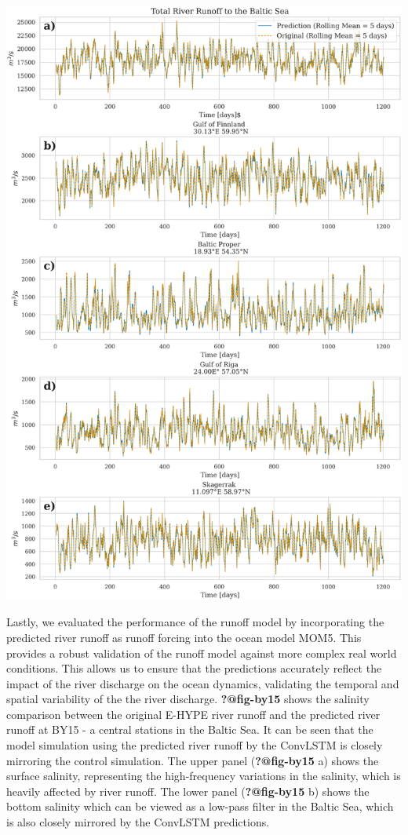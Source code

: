 \documentclass[
]{agujournal2019}
\begin{document}
\includegraphics{../src/figures/paper_total_river_runoff.png}

Lastly, we evaluated the performance of the runoff model by
incorporating the predicted river runoff as runoff forcing into the
ocean model MOM5. This provides a robust validation of the runoff model
against more complex real world conditions. This allows us to ensure
that the predictions accurately reflect the impact of the river
discharge on the ocean dynamics, validating the temporal and spatial
variability of the the river discharge. \textbf{?@fig-by15} shows the
salinity comparison between the original E-HYPE river runoff and the
predicted river runoff at BY15 - a central stations in the Baltic Sea.
It can be seen that the model simulation using the predicted river
runoff by the ConvLSTM is closely mirroring the control simulation. The
upper panel (\textbf{?@fig-by15} a) shows the surface salinity,
representing the high-frequency variations in the salinity, which is
heavily affected by river runoff. The lower panel (\textbf{?@fig-by15}
b) shows the bottom salinity which can be viewed as a low-pass filter in
the Baltic Sea, which is also closely mirrored by the ConvLSTM
predictions.
\end{document}

